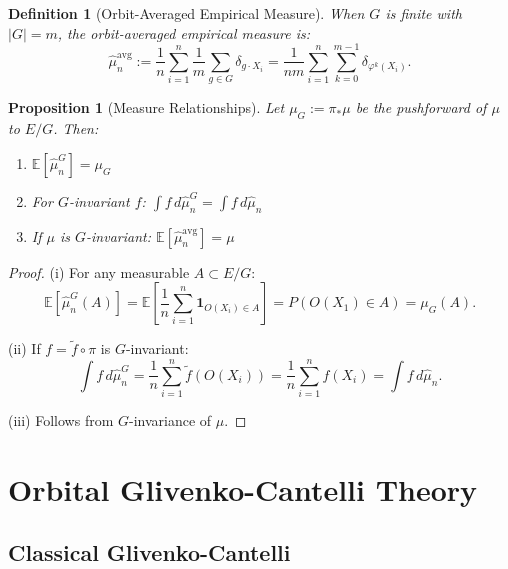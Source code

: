 \documentclass[11pt]{article}
\newtheorem{proposition}[theorem]{Proposition}
\newtheorem{definition}[theorem]{Definition}
\newcommand{\E}{\mathbb{E}}
\begin{document}
\begin{definition}[Orbit-Averaged Empirical Measure]\label{def:orbit_averaged}
When $G$ is finite with $|G| = m$, the orbit-averaged empirical measure is:
\begin{equation}\label{eq:orbit_averaged}
\hat{\mu}_n^{\mathrm{avg}} := \frac{1}{n} \sum_{i=1}^n \frac{1}{m} \sum_{g \in G} \delta_{g \cdot X_i} = \frac{1}{nm} \sum_{i=1}^n \sum_{k=0}^{m-1} \delta_{\varphi^k(X_i)}.
\end{equation}
\end{definition}

\begin{proposition}[Measure Relationships]\label{prop:measure_relations}
Let $\mu_G := \pi_* \mu$ be the pushforward of $\mu$ to $E/G$. Then:
\begin{enumerate}[label=(\roman*)]
\item $\E[\hat{\mu}_n^G] = \mu_G$
\item For $G$-invariant $f$: $\int f \, d\hat{\mu}_n^G = \int f \, d\hat{\mu}_n$
\item If $\mu$ is $G$-invariant: $\E[\hat{\mu}_n^{\mathrm{avg}}] = \mu$
\end{enumerate}
\end{proposition}

\begin{proof}
(i) For any measurable $A \subset E/G$:
\begin{equation}
\E[\hat{\mu}_n^G(A)] = \E\left[\frac{1}{n} \sum_{i=1}^n \mathbf{1}_{O(X_i) \in A}\right] = P(O(X_1) \in A) = \mu_G(A).
\end{equation}

(ii) If $f = \tilde{f} \circ \pi$ is $G$-invariant:
\begin{equation}
\int f \, d\hat{\mu}_n^G = \frac{1}{n} \sum_{i=1}^n \tilde{f}(O(X_i)) = \frac{1}{n} \sum_{i=1}^n f(X_i) = \int f \, d\hat{\mu}_n.
\end{equation}

(iii) Follows from $G$-invariance of $\mu$.
\end{proof}

\section{Orbital Glivenko-Cantelli Theory}
\label{sec:glivenko_cantelli}

\subsection{Classical Glivenko-Cantelli}
\end{document}
